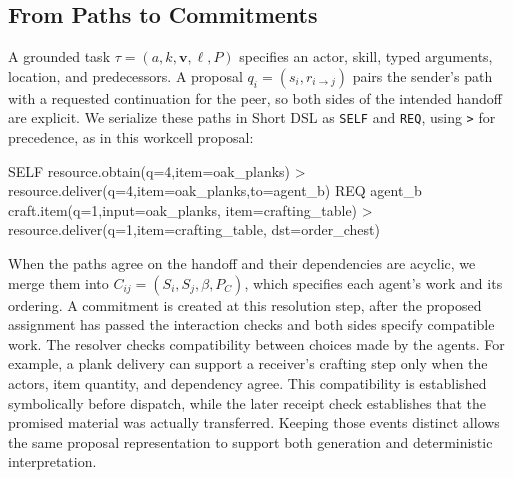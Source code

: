 \documentclass[sigconf,nonacm,balance=false]{aamas}
\begin{document}
\subsection{From Paths to Commitments}
A grounded task $\tau=(a,k,\mathbf v,\ell,P)$ specifies an actor, skill, typed arguments, location, and predecessors. A proposal $q_i=(s_i,r_{i\rightarrow j})$ pairs the sender's path with a requested continuation for the peer, so both sides of the intended handoff are explicit. We serialize these paths in Short DSL as \texttt{SELF} and \texttt{REQ}, using \texttt{>} for precedence, as in this workcell proposal:
\begin{center}
\begin{minipage}{0.96\columnwidth}
\small\ttfamily
SELF resource.obtain(q=4,item=oak\_planks)\newline
\hspace*{1em}> resource.deliver(q=4,item=oak\_planks,to=agent\_b)\newline
REQ agent\_b craft.item(q=1,input=oak\_planks,\newline
\hspace*{1em}item=crafting\_table)\newline
\hspace*{1em}> resource.deliver(q=1,item=crafting\_table,\newline
\hspace*{2em}dst=order\_chest)
\end{minipage}
\end{center}
When the paths agree on the handoff and their dependencies are acyclic, we merge them into $C_{ij}=(S_i,S_j,\beta,P_C)$, which specifies each agent's work and its ordering. A commitment is created at this resolution step, after the proposed assignment has passed the interaction checks and both sides specify compatible work. The resolver checks compatibility between choices made by the agents. For example, a plank delivery can support a receiver's crafting step only when the actors, item quantity, and dependency agree. This compatibility is established symbolically before dispatch, while the later receipt check establishes that the promised material was actually transferred. Keeping those events distinct allows the same proposal representation to support both generation and deterministic interpretation.
\end{document}
